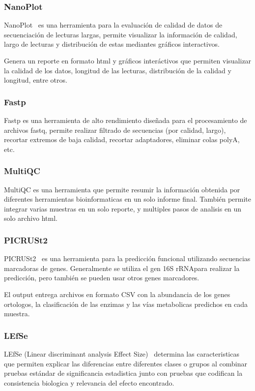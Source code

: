 \subsubsection{NanoPlot}
NanoPlot~\cite{10.1093/bioinformatics/btad311} es una herramienta para la evaluación de calidad de datos de secuenciación de lecturas largas, permite visualizar la información de calidad, largo de lecturas y distribución de estas mediantes gráficos interactivos.

Genera un reporte en formato html y gráficos interáctivos que permiten visualizar la calidad de los datos, longitud de las lecturas, distribución de la calidad y longitud, entre otros.
\subsubsection{Fastp}

Fastp\cite{chen2018fastp} es una herramienta de alto rendimiento diseñada para el procesamiento de archivos fastq, permite realizar filtrado de secuencias (por calidad, largo), recortar extremos de baja calidad, recortar adaptadores, eliminar colas polyA, etc.
\subsubsection{MultiQC}
MultiQC \cite{ewels2016multiqc} es una herramienta que permite resumir la información obtenida por diferentes herramientas bioinformaticas en un solo informe final. También permite integrar varias muestras en un solo reporte, y multiples pasos de analisis en un solo archivo html.

\subsubsection{PICRUSt2}
PICRUSt2~\cite{douglas2020picrust2} es una herramienta para la predicción funcional utilizando secuencias marcadoras de genes.
Generalmente se utiliza el gen 16S rRNApara realizar la predicción, pero también se pueden usar otros genes marcadores.

El output entrega archivos en formato CSV con la abundancia de los genes ortologos, la clasificación de las enzimas y las vías metabolicas predichos en cada muestra.

\subsubsection{LEfSe}
LEfSe (Linear discriminant analysis Effect Size)~\cite{segata2011metagenomic}  determina las caracteristicas que permiten explicar las diferencias entre diferentes clases o grupos al combinar pruebas estándar de significancia estadistica junto con pruebas que codifican la consistencia biologica y relevancia del efecto encontrado. 
